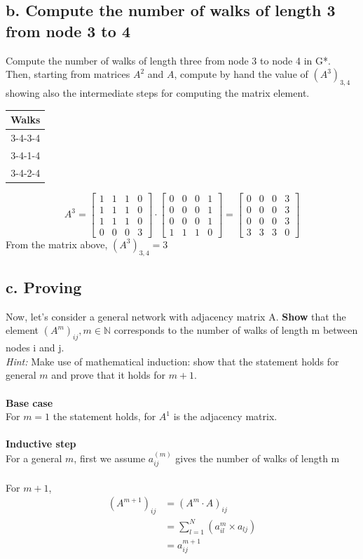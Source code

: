 \documentclass[a4paper,12pt]{article}
\begin{document}
\subsection*{b. Compute the number of walks of length 3 from node 3 to 4} Compute the number of walks of length three from node 3 to node 4 in G*. Then, starting from matrices $A^2$ and $A$, compute by hand the value of $(A^3)_{3,4}$ showing also the intermediate steps for computing the matrix element.
\begin{table}[h]
\centering
\begin{tabular}{c}
Walks\\
\hline
3-4-3-4\\
3-4-1-4\\
3-4-2-4
\end{tabular}
\end{table}

	\[A^3 = 
	\begin{bmatrix} 
		1&1&1&0\\
		1&1&1&0\\
		1&1&1&0\\
		0&0&0&3
	\end{bmatrix}
	\cdot
	\begin{bmatrix} 
		0&0&0&1\\
		0&0&0&1\\
		0&0&0&1\\
		1&1&1&0
	\end{bmatrix}	
	= 
	\begin{bmatrix} 
		0&0&0&3\\
		0&0&0&3\\
		0&0&0&3\\
		3&3&3&0
	\end{bmatrix}\]
From the matrix above, $(A^3)_{3,4} = 3$
\subsection*{c. Proving}
Now, let's consider a general network with adjacency matrix A. \textbf{Show} that the element $(A^m)_{ij}, m \in \mathbb{N}$  corresponds to the number of walks of length m between nodes i and j. \\ \textit{Hint:} Make use of mathematical induction: show that the  statement holds for general $m$ and prove that it holds for $m+1$.\\\\\textbf{Base case}\\
For $m=1$ the statement holds, for $A^1$ is the adjacency matrix.\\\\
\textbf{Inductive step}\\
For a general $m$, first we assume $a_{ij}^{(m)}$ gives the number of walks of length m\\\\
For $m+1$, 
\begin{equation}
\begin{split}
(A^{m+1})_{ij} & = (A^m \cdot A)_{ij} \\
& = \sum_{l=1}^{N} (a_{il}^m \times a_{lj})\\
& = a_{ij}^{m+1}
\end{split}
\end{equation}
\end{document}
